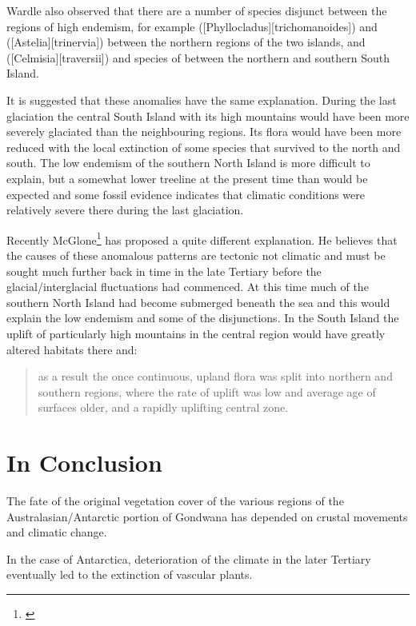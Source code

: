 Wardle also observed that there are a number of species disjunct between the regions of high endemism, for example  ([Phyllocladus][trichomanoides]) and  ([Astelia][trinervia]) between the northern regions of the two islands, and  ([Celmisia][traversii]) and species of  between the northern and southern South Island.

It is suggested that these anomalies have the same explanation.
During the last glaciation the central South Island with its high mountains would have been more severely glaciated than the neighbouring regions.
Its flora would have been more reduced with the local extinction of some species that survived to the north and south.
The low endemism of the southern North Island is more difficult to explain, but a somewhat lower treeline at the present time than would be expected and some fossil evidence indicates that climatic conditions were relatively severe there during the last glaciation.

Recently McGlone\footnote{\cite{mcglone1985plant}} has proposed a quite different explanation.
He believes that the causes of these anomalous patterns are tectonic not climatic and must be sought much further back in time in the late Tertiary before the glacial/interglacial fluctuations had commenced.
At this time much of the southern North Island had become submerged beneath the sea and this would explain the low endemism and some of the disjunctions.
In the South Island the uplift of particularly high mountains in the central region would have greatly altered habitats there and:

\begin{quote}
	as a result the once continuous, upland flora was split into northern and southern regions, where the rate of uplift was low and average age of surfaces older, and a rapidly uplifting central zone.
\end{quote}

\section{In Conclusion}

The fate of the original vegetation cover of the various regions of the Australasian/Antarctic portion of Gondwana has depended on crustal movements and climatic change.

In the case of Antarctica, deterioration of the climate in the later Tertiary eventually led to the extinction of vascular plants.

